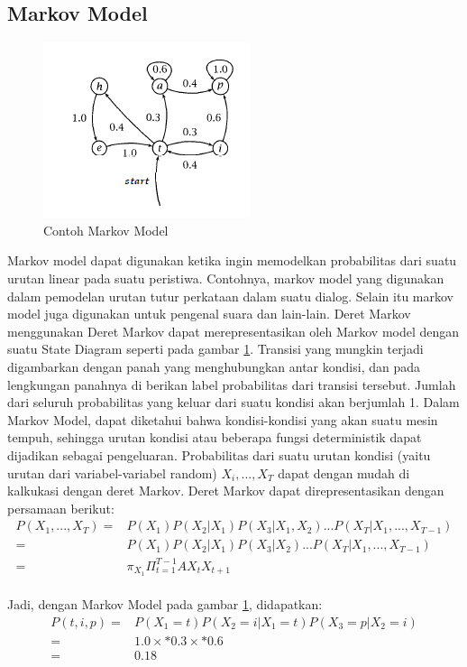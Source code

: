 \subsection{Markov Model} 
\label{sec:markov-model}
\cite{manning1999natural} 
\begin{figure}[htbp]
	\centering
		\includegraphics{Gambar/markov-model-example.png}
	\caption{Contoh Markov Model}
	\label{fig:markov-model-example}
\end{figure}
Markov model dapat digunakan ketika ingin memodelkan probabilitas dari suatu urutan linear pada suatu peristiwa. Contohnya, markov model yang digunakan dalam pemodelan urutan tutur perkataan dalam suatu dialog. Selain itu markov model juga digunakan untuk pengenal suara dan lain-lain. 
Deret Markov menggunakan 
Deret Markov dapat merepresentasikan oleh Markov model dengan suatu State Diagram seperti pada gambar \ref{fig:markov-model-example}. Transisi yang mungkin terjadi digambarkan dengan panah yang menghubungkan antar kondisi, dan pada lengkungan panahnya di berikan label probabilitas dari transisi tersebut. Jumlah dari seluruh probabilitas yang keluar dari suatu kondisi akan berjumlah 1. Dalam Markov Model, dapat diketahui bahwa kondisi-kondisi yang akan suatu mesin tempuh, sehingga urutan kondisi atau beberapa fungsi deterministik dapat dijadikan sebagai pengeluaran. 
Probabilitas dari suatu urutan kondisi (yaitu urutan dari variabel-variabel random) \(X_i,...,X_T\) dapat dengan mudah di kalkukasi dengan deret Markov. Deret Markov dapat direpresentasikan dengan persamaan berikut:
\begin{align*}
P(X_1,...,X_T) =& P(X_1)P(X_2|X_1)P(X_3|X_1,X_2)...P(X_T|X_1,...,X_{T-1})\\
=& P(X_1)P(X_2|X_1)P(X_3|X_2)...P(X_T|X_1,...,X_{T-1})\\
=& \pi_{X_1} \Pi^{T-1}_{t=1} A X_t X_{t+1}
\end{align*}\\
Jadi, dengan Markov Model pada gambar \ref{fig:markov-model-example}, didapatkan:
\begin{align*}
	P(t,i,p) =& P(X_1 = t)P(X_2 = i|X_1 = t)P(X_3 = p|X_2 = i)\\
	 =& 1.0 \times* 0.3 \times* 0.6\\
	 =& 0.18
\end{align*}

